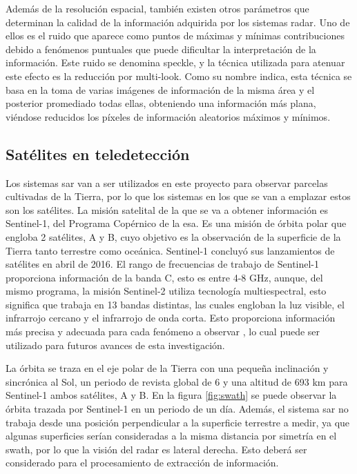 \par Además de la resolución espacial, también existen otros parámetros que determinan la calidad de la información adquirida por los sistemas radar. Uno de ellos es el ruido que aparece como puntos de máximas y mínimas contribuciones debido a fenómenos puntuales que puede dificultar la interpretación de la información. Este ruido se denomina speckle, y la técnica utilizada para atenuar este efecto es la reducción por multi-look. Como su nombre indica, esta técnica se basa en la toma de varias imágenes de información de la misma área y el posterior promediado todas ellas, obteniendo una información más plana, viéndose reducidos los píxeles de información aleatorios máximos y mínimos. 

\subsection{Satélites en teledetección}
\par Los sistemas \gls{sar} van a ser utilizados en este proyecto para observar parcelas cultivadas de la Tierra, por lo que los sistemas en los que se van a emplazar estos son los satélites. La misión satelital de la que se va a obtener información es Sentinel-1, del Programa Copérnico de la \gls{esa}. Es una misión de órbita polar que engloba 2 satélites, A y B, cuyo objetivo es la observación de la superficie de la Tierra tanto terrestre como oceánica. Sentinel-1 concluyó sus lanzamientos de satélites en abril de 2016.  El rango de frecuencias de trabajo de Sentinel-1  proporciona información de la banda C, esto es entre 4-8 GHz, aunque, del mismo programa, la misión Sentinel-2 utiliza tecnología multiespectral, esto significa que trabaja en 13 bandas distintas, las cuales engloban la luz visible, el infrarrojo cercano y el infrarrojo de onda corta. Esto proporciona información más precisa y adecuada para cada fenómeno a observar \cite{copernicusOV}, lo cual puede ser utilizado para futuros avances de esta investigación. 
\\
\par La órbita se traza en el eje polar de la Tierra con una pequeña inclinación y sincrónica al Sol, un periodo de revista global de 6 y una altitud de 693 km para Sentinel-1 ambos satélites, A y B. En la figura \ref{fig:swath} se puede observar la órbita trazada por Sentinel-1 en un periodo de un día. Además, el sistema \gls{sar} no trabaja desde una posición perpendicular a la superficie terrestre a medir, ya que algunas superficies serían consideradas a la misma distancia por simetría en el swath, por lo que la visión del radar es lateral derecha. Esto deberá ser considerado para el procesamiento de extracción de información. 
